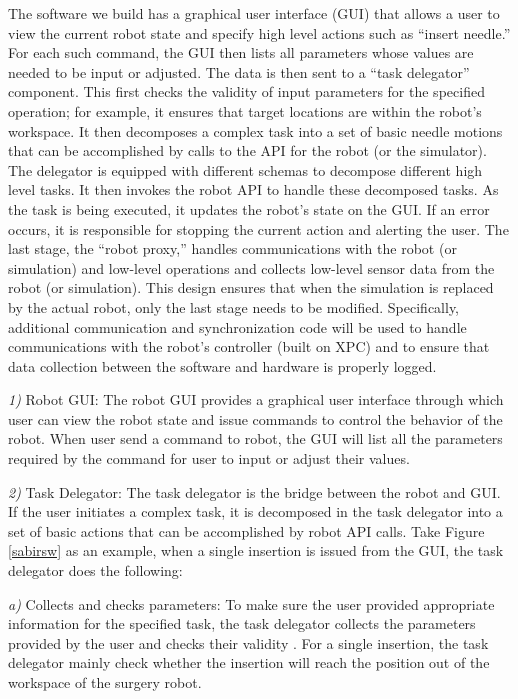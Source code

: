 The software we build has a graphical user interface (GUI) that allows a user to view the current robot state and specify high level actions such as ``insert needle.'' For each such command, the GUI then lists all parameters whose values are needed to be input or adjusted. The data is then sent to a ``task delegator'' component. This first checks the validity of input parameters for the specified operation; for example, it ensures that target locations are within the robot's workspace. It then decomposes a complex task into a set of basic needle motions that can be accomplished by calls to the API for the robot (or the simulator). The delegator is equipped with different schemas to decompose different high level tasks. It then invokes the robot API to handle these decomposed tasks. As the task is being executed, it updates the robot's state on the GUI. If an error occurs, it is responsible for stopping the current action and alerting the user. The last stage, the ``robot proxy,'' handles communications with the robot (or simulation) and low-level operations and collects low-level sensor data from the robot (or simulation). This design ensures that when the simulation is replaced by the actual robot, only the last stage needs to be modified. Specifically, additional communication and synchronization code will be used to handle communications with the robot's controller (built on XPC) and to ensure that data collection between the software and hardware is properly logged.

\emph{1)}	Robot GUI: The robot GUI provides a graphical user interface through which user can view the robot state and issue commands to control the behavior of the robot. When user send a command to robot, the GUI will list all the parameters required by the command for user to input or adjust their values.

\emph{2)}	Task Delegator: The task delegator is the bridge between the robot and GUI.  If the user initiates a complex task, it is decomposed in the task delegator into a set of basic actions that can be accomplished by robot API calls. Take Figure \ref{sabirsw} as an example, when a single insertion is issued from the GUI, the task delegator does the following:

\emph{a)}	Collects and checks parameters: To make sure the user provided appropriate information for the specified task, the task delegator collects the parameters provided by the user and checks their validity . For a single insertion, the task delegator mainly check whether the insertion will reach the position out of the workspace of the surgery robot.

